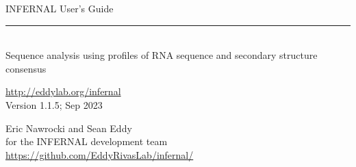 \begin{titlepage}
{\Large

\vspace*{\fill}

\noindent
{\Huge {INFERNAL User's Guide}} \vspace{-8.0pt} \\ 
\rule[2pt]{\textwidth}{1pt} \\
\hspace*{\fill} {\large {Sequence analysis using profiles of RNA
sequence and secondary structure consensus} \\ }

\vspace*{\fill}

\begin{center}
\url{http://eddylab.org/infernal}\\
Version 1.1.5; Sep 2023 \\ 

\vspace*{\fill}

Eric Nawrocki and Sean Eddy\\
for the INFERNAL development team\\
\url{https://github.com/EddyRivasLab/infernal/}
\end{center}

\vspace*{\fill}

}
\end{titlepage}
